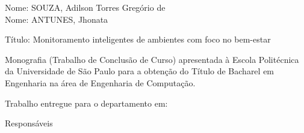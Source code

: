 \documentclass[]{politex}
\begin{document}
\capa
\falsafolhaderosto
\folhaderosto


\begin{folhadeaprovacao}
\noindent
Nome: SOUZA, Adilson Torres Gregório de\\
Nome: ANTUNES, Jhonata

\noindent
Título: Monitoramento inteligentes de ambientes com foco no bem-estar

\vspace{1cm}
\hspace{.2\textwidth} %
\begin{minipage}{.75\textwidth}
  \begin{espacoumemeio}
    \begin{sloppypar}
        Monografia (Trabalho de Conclusão de Curso) apresentada à Escola Politécnica da Universidade de São Paulo para a obtenção do Título de Bacharel em Engenharia na área de Engenharia de Computação. \\[0.3cm]
    \end{sloppypar}
  \end{espacoumemeio}
\end{minipage} 
    
\noindent
Trabalho entregue para o departamento em: \\

\begin{center}
Responsáveis
\end{center}




\end{folhadeaprovacao}


\end{document}

